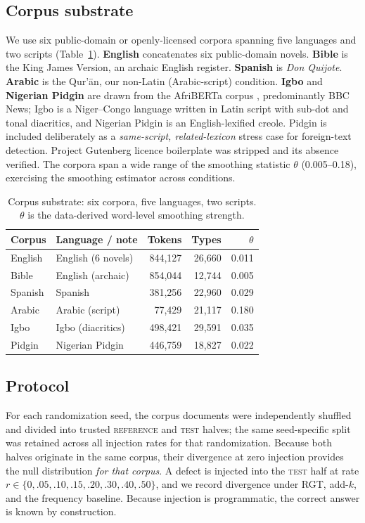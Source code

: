 \documentclass[conference]{IEEEtran}
\begin{document}
\subsection{Corpus substrate}
We use six public-domain or openly-licensed corpora spanning five languages and
two scripts (Table~\ref{tab:corpora}). \textbf{English} concatenates six public-domain
novels. \textbf{Bible} is the King James Version, an archaic English register.
\textbf{Spanish} is \emph{Don Quijote}. \textbf{Arabic} is the Qur'\={a}n, our
non-Latin (Arabic-script) condition. \textbf{Igbo} and \textbf{Nigerian Pidgin}
are drawn from the AfriBERTa corpus \cite{ogueji2021}, predominantly BBC News;
Igbo is a Niger--Congo language written in Latin script with sub-dot and tonal
diacritics, and Nigerian Pidgin is an English-lexified creole. Pidgin is included
deliberately as a \emph{same-script, related-lexicon} stress case for foreign-text
detection. Project Gutenberg licence boilerplate was stripped and its absence
verified. The corpora span a wide range of the smoothing statistic $\theta$
(0.005--0.18), exercising the smoothing estimator across conditions.

\begin{table}[hbt!]
\caption{Corpus substrate: six corpora, five languages, two scripts. $\theta$ is
the data-derived word-level smoothing strength.}
\label{tab:corpora}
\centering
\small
\setlength{\tabcolsep}{4pt}
\begin{tabular}{@{}llrrr@{}}
\toprule
Corpus & Language / note & Tokens & Types & $\theta$ \\
\midrule
English   & English (6 novels) & 844{,}127 & 26{,}660 & 0.011 \\
Bible     & English (archaic)  & 854{,}044 & 12{,}744 & 0.005 \\
Spanish   & Spanish            & 381{,}256 & 22{,}960 & 0.029 \\
Arabic    & Arabic (script)    &  77{,}429 & 21{,}117 & 0.180 \\
Igbo      & Igbo (diacritics)  & 498{,}421 & 29{,}591 & 0.035 \\
Pidgin    & Nigerian Pidgin    & 446{,}759 & 18{,}827 & 0.022 \\
\bottomrule
\end{tabular}
\end{table}

\subsection{Protocol}
For each randomization seed, the corpus documents were independently shuffled 
and divided into trusted \textsc{reference} and \textsc{test} halves; the same 
seed-specific split was retained across all injection rates for that randomization. 
Because both halves originate in the same corpus, their divergence at zero injection 
provides the null distribution \emph{for that corpus}. A defect is injected into the
\textsc{test} half at rate $r \in \{0,.05,.10,.15,.20,.30,.40,.50\}$, and we
record divergence under RGT, add-$k$, and the frequency baseline. Because
injection is programmatic, the correct answer is known by construction.
\end{document}
